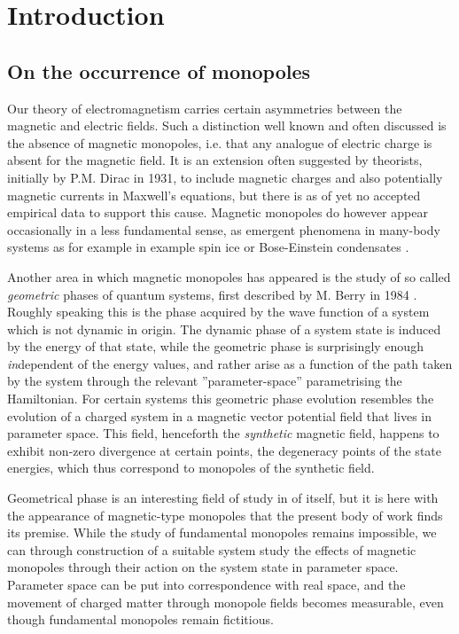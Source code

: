 \documentclass[main.tex]{subfiles}
\begin{document}
\section{Introduction}
\subsection{On the occurrence of monopoles}\label{sec:introduction}
Our theory of electromagnetism carries certain asymmetries between the magnetic and electric fields. Such a distinction well known and often discussed is the absence of magnetic monopoles, i.e. that
any analogue of electric charge is absent for the magnetic field. It is an extension often
suggested by theorists, initially by P.M. Dirac in 1931\cite{dirac}, to include magnetic
charges and also potentially magnetic currents in Maxwell's equations, but
there is as of yet no accepted empirical data to support this cause. Magnetic monopoles do
however appear occasionally in a less fundamental sense, as emergent phenomena in
many-body systems as for example in
example spin ice \cite{castelnovo} or Bose-Einstein condensates \cite{ray}. 

Another area in which magnetic monopoles has appeared is the study of so called \textit{geometric}
phases of quantum systems, first described by M. Berry in 1984 \cite{berry1984}. Roughly
speaking this is the phase acquired by the wave function of a system which is not dynamic
in origin. The dynamic phase of a system state is induced by the energy of that state,
while the geometric phase is surprisingly enough \textit{in}dependent of the energy values,
and rather arise as a function of the path taken by the system through the relevant
''parameter-space'' parametrising the Hamiltonian. For certain systems this geometric phase evolution
resembles the %
evolution of a charged system in a magnetic vector potential field that lives in 
parameter space. This field, henceforth the \textit{synthetic} magnetic field, happens to
exhibit non-zero divergence at certain points, the degeneracy points of the state energies,
which thus correspond to monopoles of the synthetic field.

Geometrical phase is an interesting field of study in of itself, but it is here with the
appearance of magnetic-type monopoles that the present body of work finds its premise.
While the study of fundamental monopoles remains impossible, we can through construction of
a suitable system study the effects of magnetic monopoles through their action on the
system state in parameter space. Parameter space can be put into correspondence with real
space, and the movement of charged matter through monopole fields
becomes measurable, even though fundamental monopoles remain fictitious.
\end{document}
